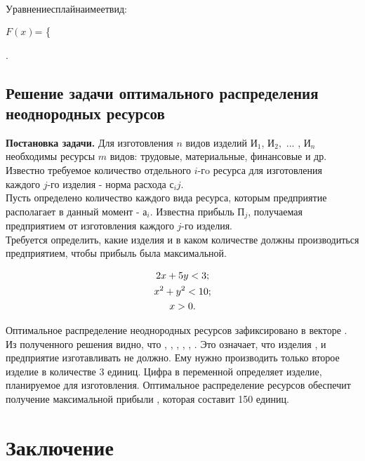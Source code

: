 \documentclass[russian,utf8,nocolumnxxxi,nocolumnxxxii]{eskdtext}
\begin{document}
       {\left \normalsize $Уравнение сплайна имеет вид:$}\\[10pt]
     {\normalsize ${F(x)}$= \left\{ 
      	\begin{aligned}
      	F_1(x)&=3.0x^3-1.46x^2+0.0x+3.43,\,\, $где$ \,\,\,{x}\in\,\,\, {$[0,\,0.5]$}};\\
      F_2(x)&=4.43x^3-8.49x^2+12.53x-4.9,\,\, $где$ \,\,\,{x}\in\,\,\, {$[0.5,\,1.4]$}};\\
    F_3(x)&=-10.8x^3-36.23x^2-19.4x+2.7,\,\, $где$ \,\,\,{x}\in\,\,\, {$[1.4,\,2.25]$}};\\
F_4(x)&=20.65x^3-5.7x^2-0.735x-0.07,\,\, $где$ \,\,\,{x}\in\,\,\, {$[2.25,\,3.5]$}}\\
      	\end{aligned}
      	
      
      	\right.\]
    }
      \newpage
      \subsection{Решение задачи оптимального распределения неоднородных ресурсов}
      \textbf{Постановка задачи. }
      Для изготовления ${n}$ видов изделий  ${И_1}$, ${И_2},$ ... , ${И_n}$ необходимы ресурсы ${m}$ видов: трудовые, материальные, финансовые и др.\\ 
      Известно требуемое количество отдельного $i$-гo ресурса для изготовления каждого $j$-го изделия - норма расхода ${с_ij}$. \\
      Пусть определено количество каждого вида ресурса, которым предприятие располагает в данный момент - ${а_i}$. Известна прибыль $П_j$, получаемая предприятием от изготовления каждого ${j}$-го изделия. \\
      Требуется определить, какие изделия и в каком количестве должны производиться предприятием, чтобы прибыль была максимальной.
      
      
      \begin{gather}
      2x+5y < 3; \\
      x^2+y^2 < 10; \\
      x > 0. \notag
      \end{gather}

      \newpage
      Оптимальное распределение неоднородных ресурсов зафиксировано в векторе . Из полученного решения видно, что , , , , , . Это означает, что изделия ,   и  предприятие изготавливать не должно. Ему нужно производить только второе изделие в количестве 3 единиц. Цифра в переменной  определяет изделие, планируемое для изготовления. Оптимальное распределение ресурсов обеспечит получение максимальной прибыли , которая составит 150 единиц.
      	\section{ Заключение}
\end{document}
